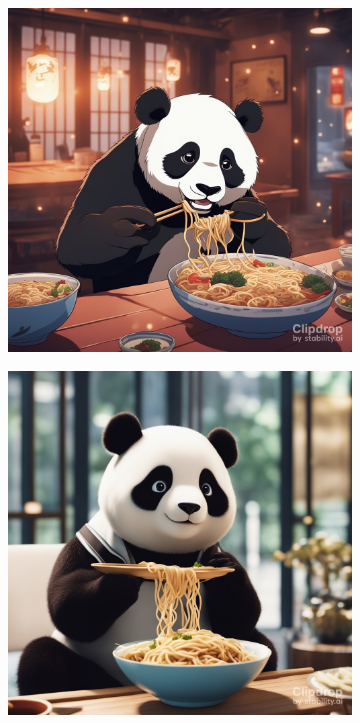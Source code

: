 \begin{figure}[!htb]
\centering
\begin{subfigure}[h]{0.22\textwidth}
  \centering
  \includegraphics[width=\linewidth]{figures/stable_diff/p4.jpg}
\end{subfigure}
\begin{subfigure}[h]{0.22\textwidth}
  \centering
  \includegraphics[width=\linewidth]{figures/stable_diff/p2.jpg}

\end{subfigure}
\end{figure}
